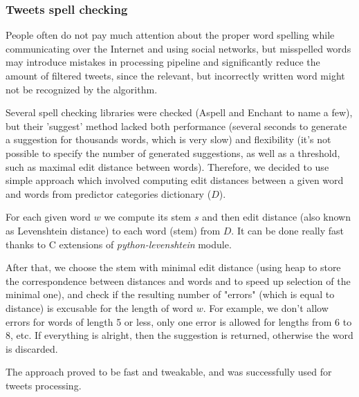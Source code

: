 \subsubsection*{Tweets spell checking}

People often do not pay much attention about the proper word spelling while communicating over the Internet and using social networks, but misspelled words may introduce mistakes in processing pipeline and significantly reduce the amount of filtered tweets, since the relevant, but incorrectly written word might not be recognized by the algorithm.

Several spell checking libraries were checked (Aspell and Enchant to name a few), but their 'suggest' method lacked both performance (several seconds to generate a suggestion for thousands words, which is very slow) and flexibility (it's not possible to specify the number of generated suggestions, as well as a threshold, such as maximal edit distance between words). Therefore, we decided to use simple approach which involved computing edit distances between a given word and words from predictor categories dictionary ($D$).

For each given word $w$ we compute its stem $s$ and then edit distance (also known as Levenshtein distance) to each word (stem) from $D$. It can be done really fast thanks to C extensions of \textit{python-levenshtein} module.

After that, we choose the stem with minimal edit distance (using heap to store the correspondence between distances and words and to speed up selection of the minimal one), and check if the resulting number of "errors" (which is equal to distance) is excusable for the length of word $w$. For example, we don't allow errors for words of length 5 or less, only one error is allowed for lengths from 6 to 8, etc. If everything is alright, then the suggestion is returned, otherwise the word is discarded.
 
The approach proved to be fast and tweakable, and was successfully used for tweets processing.
